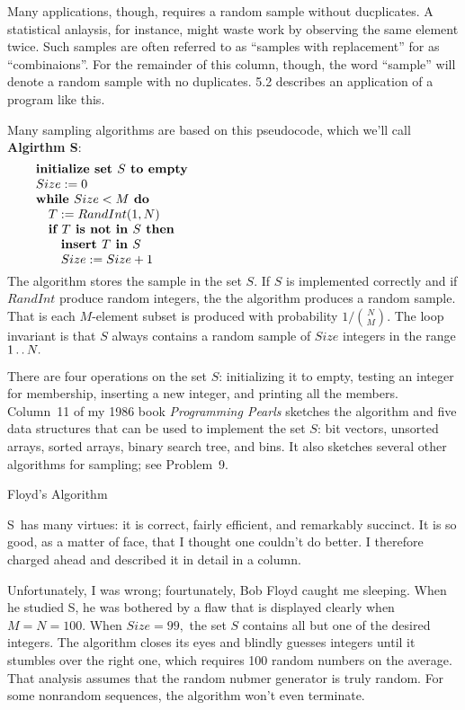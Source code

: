 Many applications, though, requires a random sample without ducplicates. A
statistical anlaysis, for instance, might waste work by observing the same
element twice. Such samples are often referred to as ``samples with replacement''
for as ``combinaions''. For the remainder of this column, though, the word
``sample'' will denote a random sample with no duplicates.
5.2 describes an application of a program like this.

Many sampling algorithms are based on this pseudocode, which we'll call
{\bf Algirthm S}:
$$\vbox{\let\par=\endgraf
\obeylines\sfcode`;=3000
{\bf initialize set $S$ to empty}
$Size := 0$
{\bf while $Size<M$ do}
\quad $T:=RandInt(1,N)$
\quad {\bf if $T$ is not in $S$ then}
\qquad {\bf insert $T$ in $S$}
\qquad $Size := Size + 1$
}$$
The algorithm stores the sample in the set $S$. If $S$ is implemented correctly
and if $RandInt$ produce random integers, the the algorithm produces a random
sample. That is each $M$-element subset is produced with probability $1/
{N\choose M}.$ The loop invariant is that $S$ always contains a random sample of
$Size$ integers in the range $1\mathinner{\ldotp\ldotp} N.$

There are four operations on the set $S$: initializing it to empty, testing an
integer for membership, inserting a new integer, and printing all the members.
Column~11 of my 1986 book {\sl Programming Pearls\/} sketches the algorithm and
five data structures that can be used to implement the set $S$: bit vectors,
unsorted arrays, sorted arrays, binary search tree, and bins. It also sketches
several other algorithms for sampling; see Problem~9.

 Floyd's Algorithm

\Alg S\ has many virtues: it is correct, fairly efficient, and remarkably
succinct. It is so good, as a matter of face, that I thought one couldn't do
better. I therefore charged ahead and described it in detail in a column.

Unfortunately, I was wrong; fourtunately, Bob Floyd caught me sleeping. When he
studied \Alg S, he was bothered by a flaw that is displayed clearly
when $M=N=100.$ When $Size=99,$ the set $S$ contains all but one of the desired
integers. The algorithm closes its eyes and blindly guesses integers until it
stumbles over the right one, which requires 100 random numbers on the average.
That analysis assumes that the random nubmer generator is truly random. For some
nonrandom sequences, the algorithm won't even terminate.

